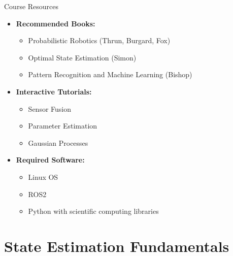 \documentclass[aspectratio=169]{beamer}
\begin{document}
\begin{frame}{Course Resources}
    \begin{itemize}
        \item<1-> \textbf{Recommended Books:}
            \begin{itemize}
                \item Probabilistic Robotics (Thrun, Burgard, Fox)
                \item Optimal State Estimation (Simon)
                \item Pattern Recognition and Machine Learning (Bishop)
            \end{itemize}
        \item<2-> \textbf{Interactive Tutorials:}
            \begin{itemize}
                \item Sensor Fusion
                \item Parameter Estimation
                \item Gaussian Processes
            \end{itemize}
        \item<3-> \textbf{Required Software:}
            \begin{itemize}
                \item Linux OS
                \item ROS2
                \item Python with scientific computing libraries
            \end{itemize}
    \end{itemize}
\end{frame}

\section{State Estimation Fundamentals}
\end{document}

